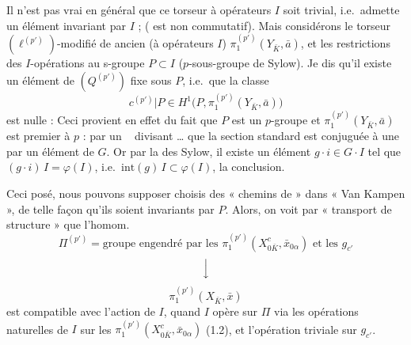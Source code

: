 \documentclass[11pt,a4paper]{article}
\begin{document}

Il n'est pas vrai en général que \struck{\ill{}} ce torseur à opérateurs $I$ soit trivial, i.e.\ admette un élément invariant par $I$ ;   ( est non commutatif). Mais considérons le \struck{\ill{}} torseur $(\ell^{(p')})$-modifié de \struck{\ill{}} ancien (à opérateurs $I$) $\pi_1^{(p')}(Y_{\bar K}, \bar a)$, et les restrictions des $I$-opérations au s-groupe $P \subset I$ ($p$-sous-groupe de Sylow). Je dis qu'il existe un élément de $(Q^{(p')})$ fixe sous $P$, i.e.\ que la classe
\[
c^{(p')}|P \in H^1\bigl(P, \pi_1^{(p')}(Y_{\bar K}, \bar a)\bigr)
\]
est nulle : Ceci provient en effet du fait que $P$ est un $p$-groupe et $\pi_1^{(p')}(Y_{\bar K}, \bar a)$ est premier à $p$ : \struck{\ill{}}  \struck{\ill{}}   par un \ \ill{} divisant \ill{}…  que la section standard \struck{\ill{}}  est conjuguée à une  par un élément de $G$. Or par la \ill{}  des Sylow, il existe un élément $g \cdot i \in G \cdot I$ tel que $(g \cdot i)\, I = \varphi(I)$, i.e.\ $\mathrm{int}(g)\, I \subset \varphi(I)$, \uncertain{\ill{}} la conclusion.


Ceci posé, nous pouvons supposer choisis des  « chemins de  » dans  « Van Kampen », \struck{\ill{}} de telle façon qu'ils soient invariants par $P$.  \struck{\ill{}}  Alors, on voit par « transport de structure » que l'homom.\ 
\[
\Pi^{(p')} = \text{groupe engendré par les } \pi_1^{(p')}(X^c_{0\bar K}, \bar x_{0\alpha}) \text{ et les } g_{c'}
\]
\[
\Bigl\downarrow
\]
\[
\pi_1^{(p')}(X_{\bar K}, \bar x)
\]
est compatible avec l'action de $I$, quand $I$ opère sur $\Pi$ via les opérations naturelles de $I$ sur les $\pi_1^{(p')}(X^c_{0\bar K}, \bar x_{0\alpha})$ (1.2), et l'opération triviale sur  $g_{c'}$.
\end{document}
